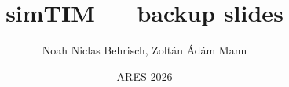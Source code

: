 

\title{simTIM --- backup slides}
\author{Noah Niclas Behrisch, Zolt\'an \'Ad\'am Mann}
\institute{}
\date{ARES 2026}




